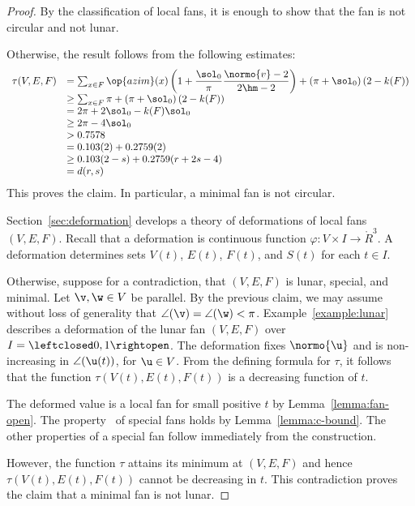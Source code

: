 \begin{proof}
By the classification of local fans, it is enough to show that the
fan is not circular and not lunar.

Otherwise, the result follows from the following estimates:
\begin{displaymath}
\begin{array}{lll}
  \tau(V,E,F) &=\sum_{x\in F} \op{azim}(x)
  \left(1 + \dfrac{\sol_0}{\pi}  \dfrac{\normo{v}-2}{2\hm-2}\right) 
+ \left(\pi+{\sol_0}\right) (2- k(F))\\
  &\ge \sum_{x\in F} \pi + \left(\pi+{\sol_0}\right) (2- k(F))\\
  &= 2\pi + 2\sol_0 - k(F) \sol_0\\
  &\ge 2\pi - 4\sol_0\\
  &> 0.7578\\
  &=0.103 (2) + 0.2759 (2)\\
  &\ge 0.103 (2-s) + 0.2759 (r+2s-4) \\ 
  &= d(r,s)\\
\end{array}
\end{displaymath}
This proves the claim.  In particular, a minimal fan is not circular.


Section~\ref{sec:deformation} develops a theory of deformations of
local fans $(V,E,F)$.  Recall that a deformation is continuous
function $\varphi:V\times I\to\ring{R}^3$.  A deformation determines
sets $V(t)$, $E(t)$, $F(t)$, and $S(t)$ for each $t\in I$.


  Otherwise, suppose for a
contradiction, that $(V,E,F)$ is lunar, special, and minimal.  Let
$\v,\w\in V$ be parallel.  By the previous claim, we may assume
without loss of generality that $\angle(\v)=\angle(\w)<\pi$.
Example~\ref{example:lunar} describes a deformation of the lunar fan
$(V,E,F)$ over $I=\leftclosed0,1\rightopen$.  The deformation fixes
$\normo{\u}$ and is non-increasing in $\angle(\u(t))$, for $\u\in V$.
From the defining formula for $\tau$, it follows that the function
$\tau(V(t),E(t),F(t))$ is a decreasing function of $t$.

  The deformed value is a local fan for small positive
$t$ by Lemma~\ref{lemma:fan-open}.  The property~ of
special fans holds by Lemma~\ref{lemma:c-bound}.  The other properties
of a special fan follow immediately from the construction.

However, the function $\tau$ attains its minimum at $(V,E,F)$ and
hence $\tau(V(t),E(t),F(t))$ cannot be decreasing in $t$.  This
contradiction proves the claim that a minimal fan is not lunar.
\end{proof}

